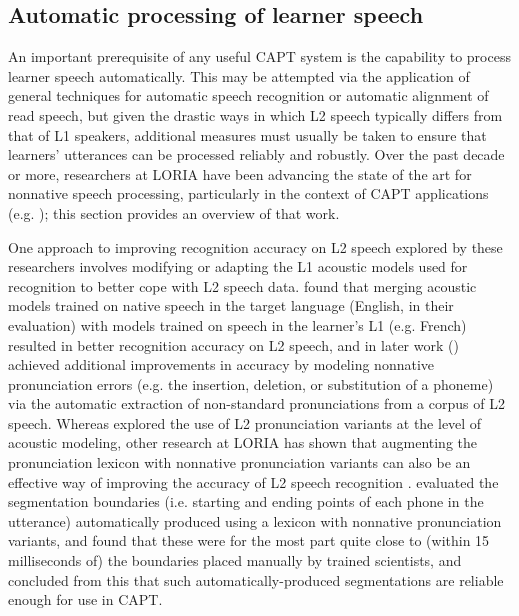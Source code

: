 	
	\subsection{Automatic processing of learner speech}
	\label{sec:capt:auto}
	
	
	An important prerequisite of any useful CAPT system is the capability to process learner speech automatically. This may be attempted via the application of general techniques for automatic speech recognition or automatic alignment of read speech, but given the drastic ways in which L2 speech typically differs from that of L1 speakers, additional measures must usually be taken to ensure that learners' utterances can be processed reliably and robustly.
	Over the past decade or more, researchers at LORIA have been advancing the state of the art for nonnative speech processing, particularly in the context of CAPT applications 
	(e.g. \cite{Bouselmi2005,Bouselmi2012,%
	Mesbahi2011,Orosanu2012,Jouvet2011,Bonneau2012}); this section provides an overview of that work.
	
	
	One approach to improving recognition accuracy on L2 speech explored by these researchers involves modifying or adapting the L1 acoustic models used for recognition to better cope with L2 speech data. \textcite{Bouselmi2005} found that merging acoustic models trained on native speech in the target language (English, in their evaluation) with models trained on speech in the learner's L1 (e.g. French) resulted in better recognition accuracy on L2 speech, and in later work (\citeyear{Bouselmi2012}) achieved additional improvements in accuracy 
	by modeling nonnative pronunciation errors (e.g. the insertion, deletion, or substitution of a phoneme) via the automatic extraction of non-standard pronunciations from a corpus of L2 speech. Whereas \textcite{Bouselmi2012} explored the use of L2 pronunciation variants at the level of acoustic modeling, other research at LORIA has shown that augmenting the pronunciation lexicon with nonnative pronunciation variants can also be an effective way of improving the accuracy of L2 speech recognition \citep{Jouvet2011,Mesbahi2011,Bonneau2012}. \textcite{Mesbahi2011} evaluated the segmentation boundaries (i.e. starting and ending points of each phone in the utterance) automatically produced using a lexicon with nonnative pronunciation variants, and found that these were for the most part quite close to (within 15 milliseconds of) the boundaries placed manually by trained scientists, and concluded from this that such automatically-produced segmentations are reliable enough for use in CAPT. 
	
